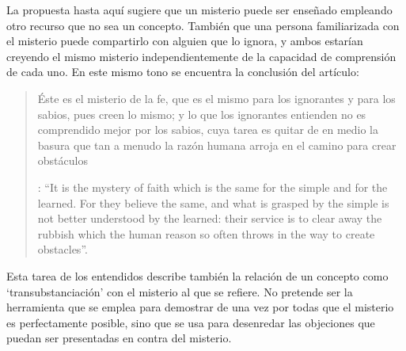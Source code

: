 La propuesta hasta aquí sugiere que un misterio puede ser enseñado empleando otro recurso que no sea un concepto. También que una persona familiarizada con el misterio puede compartirlo con alguien que lo ignora, y ambos estarían creyendo el mismo misterio independientemente de la capacidad de comprensión de cada uno. En este mismo tono se encuentra la conclusión del artículo: \blockquote[
{\Cite[112]{anscombe1981erp:ot}}: \enquote{It is the mystery of faith which is the same for the simple and for the learned. For they believe the same, and what is grasped by the simple is not better understood by the learned: their service is to clear away the rubbish which the human reason so often throws in the way to create obstacles}.
]{Éste es el misterio de la fe, que es el mismo para los ignorantes y para los sabios, pues creen lo mismo; y lo que los ignorantes entienden no es comprendido mejor por los sabios, cuya tarea es quitar de en medio la basura que tan a menudo la razón humana arroja en el camino para crear obstáculos}. Esta tarea de los entendidos describe también la relación de un concepto como `transubstanciación' con el misterio al que se refiere. No pretende ser la herramienta que se emplea para demostrar de una vez por todas que el misterio es perfectamente posible, sino que se usa para desenredar las objeciones que puedan ser presentadas en contra del misterio.

